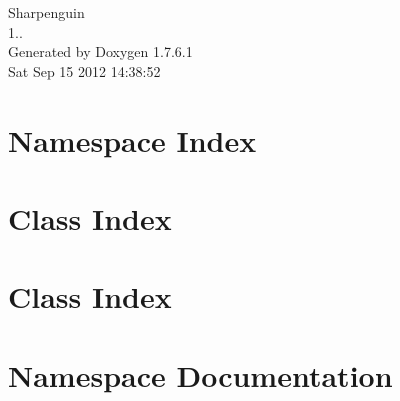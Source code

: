 \documentclass[a4paper]{book}
\begin{document}
\hypersetup{pageanchor=false,citecolor=blue}
\begin{titlepage}
\vspace*{7cm}
\begin{center}
{\Large \-Sharpenguin \\[1ex]\large 1.. }\\
\vspace*{1cm}
{\large \-Generated by Doxygen 1.7.6.1}\\
\vspace*{0.5cm}
{\small Sat Sep 15 2012 14:38:52}\\
\end{center}
\end{titlepage}
\clearemptydoublepage
{}
\tableofcontents
\clearemptydoublepage
{}
\hypersetup{pageanchor=true,citecolor=blue}
\chapter{\-Namespace \-Index}

\chapter{\-Class \-Index}

\chapter{\-Class \-Index}

\chapter{\-Namespace \-Documentation}









\end{document}
